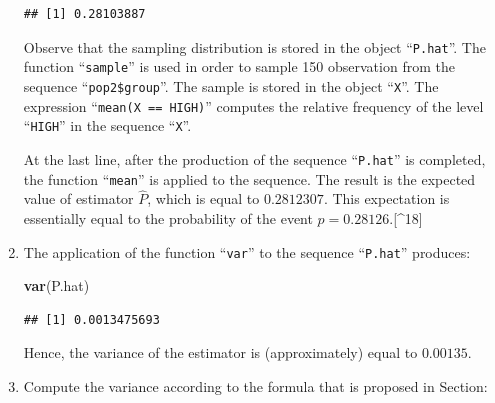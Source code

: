 \documentclass[]{krantz}
\makeatletter
\newenvironment{Shaded}{\begin{snugshade}}{\end{snugshade}}
\newcommand{\ControlFlowTok}[1]{\textcolor[rgb]{0.13,0.29,0.53}{\textbf{#1}}}
\newcommand{\DecValTok}[1]{\textcolor[rgb]{0.00,0.00,0.81}{#1}}
\newcommand{\KeywordTok}[1]{\textcolor[rgb]{0.13,0.29,0.53}{\textbf{#1}}}
\newcommand{\NormalTok}[1]{#1}
\newcommand{\OperatorTok}[1]{\textcolor[rgb]{0.81,0.36,0.00}{\textbf{#1}}}
\newcommand{\StringTok}[1]{\textcolor[rgb]{0.31,0.60,0.02}{#1}}
\newenvironment{kframe}{%
\medskip{}
\setlength{\fboxsep}{.8em}
 \def\at@end@of@kframe{}%
 \ifinner\ifhmode%
  \def\at@end@of@kframe{\end{minipage}}%
  \begin{minipage}{\columnwidth}%
 \fi\fi%
 \def\FrameCommand##1{\hskip\@totalleftmargin \hskip-\fboxsep
 \colorbox{shadecolor}{##1}\hskip-\fboxsep
     \hskip-\linewidth \hskip-\@totalleftmargin \hskip\columnwidth}%
 \MakeFramed {\advance\hsize-\width
   \@totalleftmargin\z@ \linewidth\hsize
   \@setminipage}}%
 {\par\unskip\endMakeFramed%
 \at@end@of@kframe}
\renewenvironment{Shaded}{\begin{kframe}}{\end{kframe}}
\theoremstyle{definition}
\theoremstyle{definition}
\theoremstyle{definition}
\theoremstyle{remark}
\makeatother
\begin{document}
\begin{enumerate}
\begin{Shaded}
\end{Shaded}

\begin{verbatim}
## [1] 0.28103887
\end{verbatim}

  Observe that the sampling distribution is stored in the object
  ``\texttt{P.hat}''. The function ``\texttt{sample}'' is used in order to sample 150
  observation from the sequence ``\texttt{pop2\$group}''. The sample is stored in
  the object ``\texttt{X}''. The expression ``\texttt{mean(X\ ==\ HIGH)}'' computes the
  relative frequency of the level ``\texttt{HIGH}'' in the sequence ``\texttt{X}''.

  At the last line, after the production of the sequence ``\texttt{P.hat}'' is
  completed, the function ``\texttt{mean}'' is applied to the sequence. The result
  is the expected value of estimator \(\hat P\), which is equal to
  \(0.2812307\). This expectation is essentially equal to the probability of
  the event \(p = 0.28126\).{[}\^{}18{]}
\item
  The application of the function
  ``\texttt{var}'' to the sequence ``\texttt{P.hat}'' produces:

\begin{Shaded}
\begin{Highlighting}[]
\KeywordTok{var}\NormalTok{(P.hat)}
\end{Highlighting}
\end{Shaded}

\begin{verbatim}
## [1] 0.0013475693
\end{verbatim}

  Hence, the variance of the estimator is (approximately) equal to
  \(0.00135\).
\item
  Compute the variance according to
  the formula that is proposed in Section:


\end{enumerate}
\end{document}
